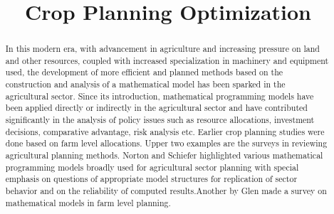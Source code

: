 \documentclass[conference]{IEEEtran}
\begin{document}
\title{Crop Planning Optimization\\
}

\author{
\and
{}
\and
{}
\and
{}
\and
{}
}

\maketitle

\begin{abstract}
In this modern era, with advancement in agriculture and increasing pressure on land and other resources, coupled with increased specialization in machinery and equipment used, the development of more efficient and planned methods based on the construction and analysis of a mathematical model has been sparked in the agricultural sector. Since its introduction, mathematical programming models have been applied directly or indirectly in the agricultural sector and have contributed significantly in the analysis of policy issues such as resource allocations, investment decisions, comparative advantage, risk analysis etc. Earlier crop planning studies were done based on farm level allocations. Upper two examples are the surveys in reviewing agricultural planning methods. Norton and Schiefer highlighted various mathematical programming models broadly used for agricultural sector planning with special emphasis on questions of appropriate model structures for replication of sector behavior and on the reliability of computed results.Another by Glen made a survey on mathematical models in farm level planning.
\end{abstract}
\end{document}
